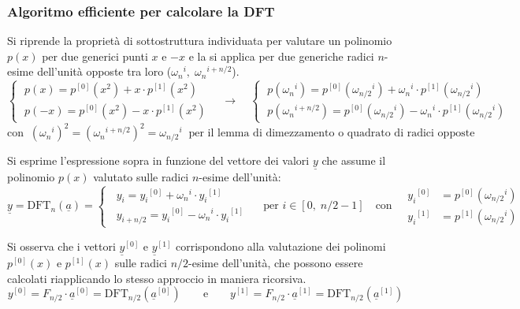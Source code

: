 \subsubsection*{Algoritmo efficiente per calcolare la DFT}
Si riprende la proprietà di sottostruttura individuata per valutare un polinomio \(p(x)\) per due generici punti \(x\) e
\(-x\) e la si applica per due generiche radici \(n\)-esime dell'unità opposte tra loro (\({\omega_n}^i, \; {\omega_n}^{i+n/2}\)).
\[\left\{ \; \begin{aligned}
	p(x) = p^{[0]}\!\left(x^2\right) + x \cdot p^{[1]}\!\left(x^2\right) \\
	p(-x) = p^{[0]}\!\left(x^2\right) - x \cdot p^{[1]}\!\left(x^2\right)
\end{aligned} \right. \quad \longrightarrow \quad \left\{ \; \begin{aligned}
	p \!\left({\omega_n}^i\right) = p^{[0]}\!\left({\omega_{n/2}}^i\right) + {\omega_n}^i \cdot p^{[1]}\!\left({\omega_{n/2}}^i\right) \\
	p \!\left({\omega_n}^{i + n/2}\right) = p^{[0]}\!\left({\omega_{n/2}}^i\right) - {\omega_n}^i \cdot p^{[1]}\!\left({\omega_{n/2}}^i\right)
\end{aligned} \right.\]
\[\text{con} \;\; \left({\omega_n}^i\right)^2 = \left({\omega_n}^{i + n/2}\right)^2 = {\omega_{n/2}}^i \;\; \text{per il lemma di dimezzamento o quadrato di radici opposte}\]

\noindent
Si esprime l'espressione sopra in funzione del vettore dei valori \(\underline{y}\) che assume il polinomio \(p(x)\) valutato
sulle radici \(n\)-esime dell'unità:
\[\underline{y} = \text{DFT}_n \left( \underline{a} \right) = \left\{ \;\; \begin{aligned}
	y_i = {y_i}^{[0]} + {\omega_n}^i \cdot {y_i}^{[1]} \\[4pt]
	y_{i + n/2} = {y_i}^{[0]} - {\omega_n}^i \cdot {y_i}^{[1]}
\end{aligned} \right. \quad \text{ per } i \in [0, \; n/2\!-\!1] \quad \text{con} \quad \begin{aligned}{}
	{y_i}^{[0]} &= p^{[0]} \! \left( {\omega_{n/2}}^i \right) \\ {y_i}^{[1]} &= p^{[1]} \! \left( {\omega_{n/2}}^i \right)
\end{aligned}\]

\noindent
Si osserva che i vettori \(\underline{y}^{[0]}\) e \(\underline{y}^{[1]}\) corrispondono alla valutazione dei polinomi
\(p^{[0]}(x)\) e \(p^{[1]}(x)\) sulle radici \(n/2\)-esime dell'unità, che possono essere calcolati riapplicando lo stesso
approccio in maniera ricorsiva.
\[y^{[0]} = F_{n/2} \cdot \underline{a}^{[0]} = \text{DFT}_{n/2} \! \left( \underline{a}^{[0]} \right) \qquad \text{e} \qquad y^{[1]} = F_{n/2} \cdot \underline{a}^{[1]} = \text{DFT}_{n/2} \! \left( \underline{a}^{[1]} \right)\]

